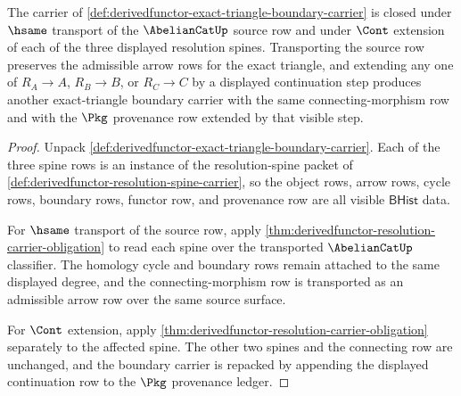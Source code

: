 \begin{theorem}\label{thm:derivedfunctor-exact-triangle-boundary-carrier-scope}
The carrier of \autoref{def:derivedfunctor-exact-triangle-boundary-carrier} is closed under $\hsame$ transport of the $\AbelianCatUp$ source row and under $\Cont$ extension of each of the three displayed resolution spines. Transporting the source row preserves the admissible arrow rows for the exact triangle, and extending any one of $R_A\to A$, $R_B\to B$, or $R_C\to C$ by a displayed continuation step produces another exact-triangle boundary carrier with the same connecting-morphism row and with the $\Pkg$ provenance row extended by that visible step.
\end{theorem}
\begin{proof}
Unpack \autoref{def:derivedfunctor-exact-triangle-boundary-carrier}. Each of the three spine rows is an instance of the resolution-spine packet of \autoref{def:derivedfunctor-resolution-spine-carrier}, so the object rows, arrow rows, cycle rows, boundary rows, functor row, and provenance row are all visible $\mathsf{BHist}$ data.

For $\hsame$ transport of the source row, apply \autoref{thm:derivedfunctor-resolution-carrier-obligation} to read each spine over the transported $\AbelianCatUp$ classifier. The homology cycle and boundary rows remain attached to the same displayed degree, and the connecting-morphism row is transported as an admissible arrow row over the same source surface.

For $\Cont$ extension, apply \autoref{thm:derivedfunctor-resolution-carrier-obligation} separately to the affected spine. The other two spines and the connecting row are unchanged, and the boundary carrier is repacked by appending the displayed continuation row to the $\Pkg$ provenance ledger.
\end{proof}

